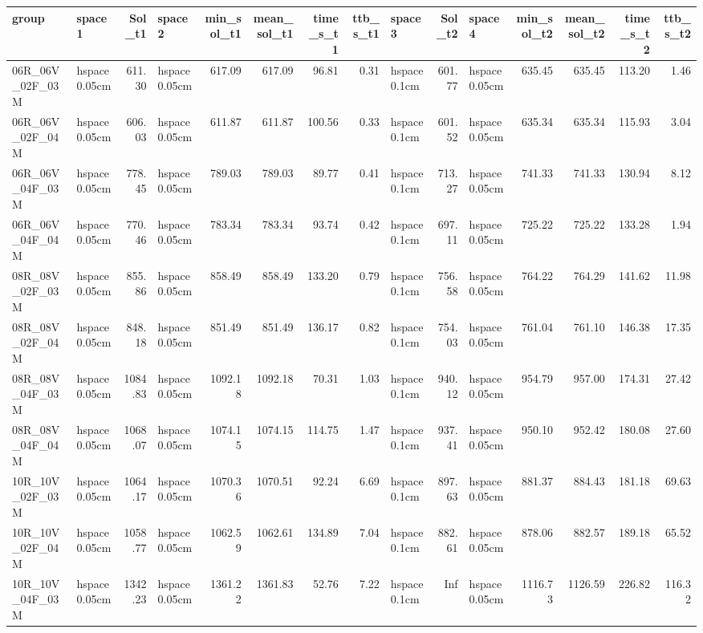 
\begin{tabular}{llrlrrrrlrlrrrr}
\toprule
group & space1 & Sol_t1 & space2 & min_sol_t1 & mean_sol_t1 & time_s_t1 & ttb_s_t1 & space3 & Sol_t2 & space4 & min_sol_t2 & mean_sol_t2 & time_s_t2 & ttb_s_t2\\
\midrule
06R_06V_02F_03M & hspace{0.05cm} & 611.30 & hspace{0.05cm} & 617.09 & 617.09 & 96.81 & 0.31 & hspace{0.1cm} & 601.77 & hspace{0.05cm} & 635.45 & 635.45 & 113.20 & 1.46\\
06R_06V_02F_04M & hspace{0.05cm} & 606.03 & hspace{0.05cm} & 611.87 & 611.87 & 100.56 & 0.33 & hspace{0.1cm} & 601.52 & hspace{0.05cm} & 635.34 & 635.34 & 115.93 & 3.04\\
06R_06V_04F_03M & hspace{0.05cm} & 778.45 & hspace{0.05cm} & 789.03 & 789.03 & 89.77 & 0.41 & hspace{0.1cm} & 713.27 & hspace{0.05cm} & 741.33 & 741.33 & 130.94 & 8.12\\
06R_06V_04F_04M & hspace{0.05cm} & 770.46 & hspace{0.05cm} & 783.34 & 783.34 & 93.74 & 0.42 & hspace{0.1cm} & 697.11 & hspace{0.05cm} & 725.22 & 725.22 & 133.28 & 1.94\\
\addlinespace
08R_08V_02F_03M & hspace{0.05cm} & 855.86 & hspace{0.05cm} & 858.49 & 858.49 & 133.20 & 0.79 & hspace{0.1cm} & 756.58 & hspace{0.05cm} & 764.22 & 764.29 & 141.62 & 11.98\\
08R_08V_02F_04M & hspace{0.05cm} & 848.18 & hspace{0.05cm} & 851.49 & 851.49 & 136.17 & 0.82 & hspace{0.1cm} & 754.03 & hspace{0.05cm} & 761.04 & 761.10 & 146.38 & 17.35\\
08R_08V_04F_03M & hspace{0.05cm} & 1084.83 & hspace{0.05cm} & 1092.18 & 1092.18 & 70.31 & 1.03 & hspace{0.1cm} & 940.12 & hspace{0.05cm} & 954.79 & 957.00 & 174.31 & 27.42\\
08R_08V_04F_04M & hspace{0.05cm} & 1068.07 & hspace{0.05cm} & 1074.15 & 1074.15 & 114.75 & 1.47 & hspace{0.1cm} & 937.41 & hspace{0.05cm} & 950.10 & 952.42 & 180.08 & 27.60\\
\addlinespace
10R_10V_02F_03M & hspace{0.05cm} & 1064.17 & hspace{0.05cm} & 1070.36 & 1070.51 & 92.24 & 6.69 & hspace{0.1cm} & 897.63 & hspace{0.05cm} & 881.37 & 884.43 & 181.18 & 69.63\\
10R_10V_02F_04M & hspace{0.05cm} & 1058.77 & hspace{0.05cm} & 1062.59 & 1062.61 & 134.89 & 7.04 & hspace{0.1cm} & 882.61 & hspace{0.05cm} & 878.06 & 882.57 & 189.18 & 65.52\\
10R_10V_04F_03M & hspace{0.05cm} & 1342.23 & hspace{0.05cm} & 1361.22 & 1361.83 & 52.76 & 7.22 & hspace{0.1cm} & Inf & hspace{0.05cm} & 1116.73 & 1126.59 & 226.82 & 116.32\\

\end{tabular}
